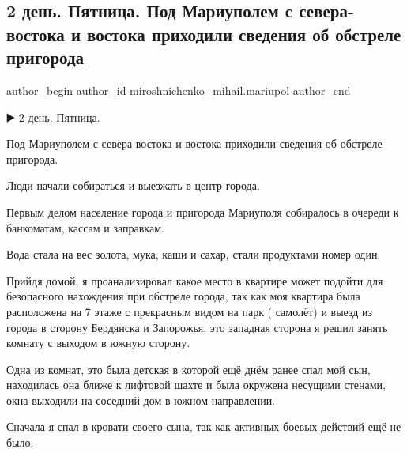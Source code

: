  
 
 
 
 

\subsection{2 день. Пятница. Под Мариуполем с севера-востока и востока приходили сведения об обстреле пригорода}
\label{sec:25_02_2023.fb.miroshnichenko_mihail.mariupol.1.2_den__pyatnitsa__po}

\ifcmt
 author_begin
   author_id miroshnichenko_mihail.mariupol
 author_end
\fi

▶️ 2 день. Пятница. 

Под Мариуполем с севера-востока и востока приходили сведения об обстреле
пригорода.

Люди начали собираться и выезжать в центр города.

Первым делом население города и пригорода Мариуполя собиралось в очереди к
банкоматам, кассам и заправкам.

Вода стала на вес золота, мука, каши и сахар, стали продуктами номер один.

Прийдя домой, я проанализировал какое место в квартире может подойти для
безопасного нахождения при обстреле города, так как моя квартира была
расположена на 7 этаже с прекрасным видом на парк  ( самолёт) и выезд из города
в сторону Бердянска и Запорожья, это западная сторона я решил занять комнату с
выходом в южную сторону.

Одна из комнат, это была детская в которой ещё днём ранее спал мой сын,
находилась она ближе к лифтовой шахте и была окружена несущими стенами, окна
выходили на  соседний дом в южном направлении.

Сначала я спал в кровати своего сына, так как активных боевых действий ещё не
было.

